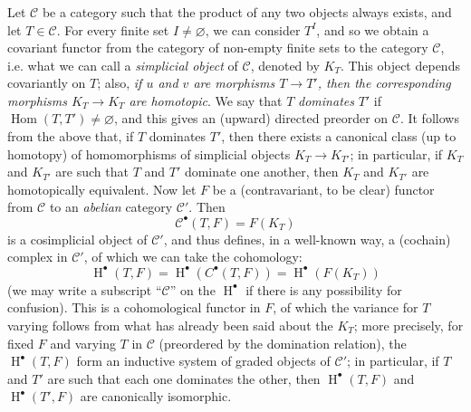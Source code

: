 \documentclass{article}
\theoremstyle{plain}
\theoremstyle{definition}
\newcommand{\cat}[1]{{\mathcal{#1}}}
\DeclareMathOperator{\Hom}{Hom}
\DeclareMathOperator{\HH}{H}
\begin{document}
\subsubsection{}
\label{A.4.a}

Let $\cat{C}$ be a category such that the product of any two objects always exists, and let $T\in\cat{C}$.
For every finite set $I\neq\varnothing$, we can consider $T^I$, and so we obtain a covariant functor from the category of non-empty finite sets to the category $\cat{C}$, i.e. what we can call a \emph{simplicial object} of $\cat{C}$, denoted by $K_T$.
This object depends covariantly on $T$;
also, \emph{if $u$ and $v$ are morphisms $T\to T'$, then the corresponding morphisms $K_T\to K_{T}$ are homotopic}.
We say that $T$ \emph{dominates} $T'$ if $\Hom(T,T')\neq\varnothing$, and this gives an (upward) directed preorder on $\cat{C}$.
It follows from the above that, if $T$ dominates $T'$, then there exists a canonical class (up to homotopy) of homomorphisms of simplicial objects $K_T\to K_{T'}$;
in particular, if $K_T$ and $K_{T'}$ are such that $T$ and $T'$ dominate one another, then $K_T$ and $K_{T'}$ are homotopically equivalent.
Now let $F$ be a (contravariant, to be clear) functor from $\cat{C}$ to an \emph{abelian} category $\cat{C}'$.
Then
\[
  \cat{C}^\bullet(T,F) = F(K_T)
\]
is a cosimplicial object of $\cat{C}'$, and thus defines, in a well-known way, a (cochain) complex in $\cat{C}'$, of which we can take the cohomology:
\[
  \HH^\bullet(T,F)
  = \HH^\bullet(C^\bullet(T,F))
  = \HH^\bullet(F(K_T))
\]
(we may write a subscript ``$\cat{C}$'' on the $\HH^\bullet$ if there is any possibility for confusion).
This is a cohomological functor in $F$, of which the variance for $T$ varying follows from what has already been said about the $K_T$;
more precisely, for fixed $F$ and varying $T$ in $\cat{C}$ (preordered by the domination relation), the $\HH^\bullet(T,F)$ form an inductive system of graded objects of $\cat{C}'$;
in particular, if $T$ and $T'$ are such that each one dominates the other, then $\HH^\bullet(T,F)$ and $\HH^\bullet(T',F)$ are canonically isomorphic.



\end{document}
